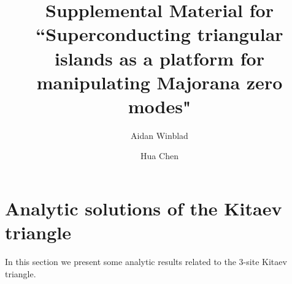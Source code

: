 \documentclass[aps,prb,showpacs,amsmath,amssymb,superscriptaddress]{revtex4-2}
\begin{document}
\title{Supplemental Material for ``Superconducting triangular islands as a platform for manipulating Majorana zero modes"}

\author{Aidan Winblad}

\author{Hua Chen}

\maketitle

\section{Analytic solutions of the Kitaev triangle}
In this section we present some analytic results related to the 3-site Kitaev triangle.
\end{document}
